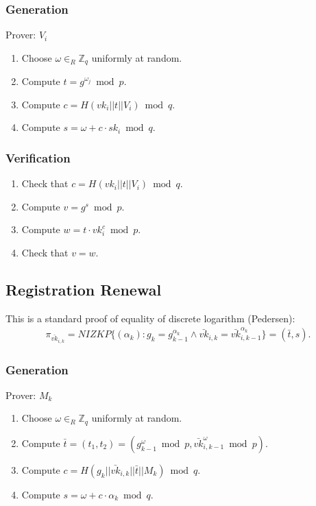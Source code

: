 \documentclass[bibtotoc,halfparskip,oneside]{scrreprt}
\newcommand{\sk}[1]{\mathit{sk}_{#1}\xspace}
\newcommand{\vk}[1]{\mathit{vk}_{#1}\xspace}
\newcommand{\vkbar}[1]{\bar{\mathit{vk}}_{#1}\xspace}
\newcommand{\Mixer}[1]{\ensuremath{\mathit{M}_{#1}}\xspace}
\newcommand{\Voter}[1]{\ensuremath{\mathit{V}_{#1}}\xspace}
\begin{document}
\subsubsection{Generation}
Prover: $\Voter{i}$
\begin{enumerate}	
	\item Choose $\omega\in_R\mathbb{Z}_q$ uniformly at random.
	\item Compute $t=g^{\omega_j}\bmod{p}$.
	\item Compute $c=H(\vk{i}||t||\Voter{i})\bmod{q}$.
	\item Compute $s=\omega + c \cdot \sk{i} \bmod{q}$.
\end{enumerate}	

\subsubsection{Verification}
\begin{enumerate}
	\item Check that $c=H(\vk{i}||t||\Voter{i})\bmod{q}$.
	\item Compute $v=g^{s}\bmod{p}$.
	\item Compute $w=t\cdot \vk{i}^{c}\bmod{p}$.
	\item Check that $v=w$.
\end{enumerate}

\subsection{Registration Renewal}\label{proof_reg_new}

This is a standard proof of equality of discrete logarithm (Pedersen):
\begin{align*}
\pi_{\vkbar{i,k}}=\mathit{NIZKP}\{(\alpha_k):g_k=g_{k-1}^{\alpha_k}\wedge\vkbar{i,k}=\vkbar{i,k-1}^{\alpha_k}\}=(\bar{t},s).
\end{align*}

\subsubsection{Generation}
Prover: $\Mixer{k}$
\begin{enumerate}	
	\item Choose $\omega\in_R\mathbb{Z}_q$ uniformly at random.
	\item Compute $\bar{t}=(t_{1},t_{2})=(g_{k-1}^{\omega}\bmod{p},\vkbar{i,k-1}^{\omega}\bmod{p})$.
	\item Compute $c=H(g_k||\vkbar{i,k}||\bar{t}||\Mixer{k})\bmod{q}$.
	\item Compute $s=\omega + c\cdot \alpha_k\bmod{q}$.
\end{enumerate}
\end{document}
